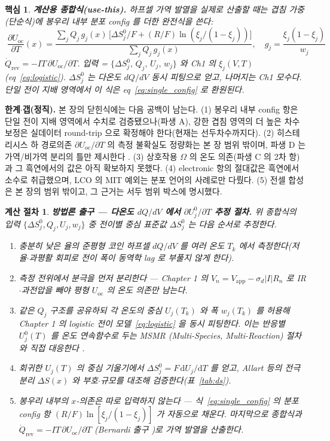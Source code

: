 \documentclass[11pt,a4paper]{article}
\newtheorem*{keybox}{핵심}
\newtheorem*{procedurebox}{계산 절차}
\newcommand{\dd}{\mathrm{d}}
\newcommand{\rev}{\mathrm{rev}}
\newcommand{\oc}{\mathrm{oc}}
\begin{document}
\begin{keybox}
\textbf{계산용 종합식(use-this).} 하프셀 가역 발열을 실제로 산출할 때는 겹침 가중(단순식)에 봉우리 내부 분포
config 를 더한 \emph{완전식}을 쓴다:
\[
\boxed{\;\frac{\partial U_\oc}{\partial T}(x)
=\frac{\sum_j Q_j\,g_j(x)\,\bigl[\Delta S^0_j/F+(R/F)\ln(\xi_j/(1-\xi_j))\bigr]}{\sum_j Q_j\,g_j(x)},\quad
g_j=\frac{\xi_j(1-\xi_j)}{w_j}\;}
\]
$\dot Q_\rev=-IT\,\partial U_\oc/\partial T$. \emph{입력} = $\{\Delta S^0_j,\,Q_j,\,U_j,\,w_j\}$ 와 Ch1 의
$\xi_j(V,T)$(eq~\eqref{eq:logistic}). $\Delta S^0_j$ 는 다온도 $dQ/dV$ 동시 피팅으로 얻고, 나머지는 Ch1 모수다.
단일 전이 지배 영역에서 이 식은 eq~\eqref{eq:single_config} 로 환원된다.
\end{keybox}

\textbf{한계$\cdot$갭(정직).} 본 장의 닫힌식에는 다음 공백이 남는다. (1) 봉우리 내부 config 항은 단일 전이
지배 영역에서 수치로 검증됐으나(파생 A), 강한 겹침 영역의 더 높은 차수 보정은 실데이터 round-trip 으로
확정해야 한다(현재는 선두차수까지다). (2) 히스테리시스 하 경로의존 $\partial U_\oc/\partial T$ 의 측정 불확실도
정량화는 본 장 범위 밖이며, 파생 D 는 가역/비가역 분리의 틀만 제시한다 \cite{hysteresis2018}. (3) 상호작용
$\Omega$ 의 온도 의존(파생 C 의 2차 항)과 그 흑연에서의 값은 아직 확보하지 못했다. (4) electronic 항의 절대값은
흑연에서 소수로 취급했으며, LCO 의 MIT 예외는 분포 언어의 사례로만 다뤘다. (5) 전셀 합성은 본 장의 범위
밖이고, 그 근거는 서두 범위 박스에 명시했다.

\begin{procedurebox}
\textbf{방법론 출구 — 다온도 $dQ/dV$ 에서 $\partial U_j^0/\partial T$ 추정 절차.} 위 종합식의 입력
$\{\Delta S^0_j,Q_j,U_j,w_j\}$ 중 전이별 중심 표준값 $\Delta S^0_j$ 는 다음 순서로 추정한다.
\begin{enumerate}[leftmargin=1.8em,itemsep=2pt,topsep=2pt]
\item 충분히 낮은 율의 준평형 코인 하프셀 $dQ/dV$ 를 여러 온도 $T_k$ 에서 측정한다(저율$\cdot$과평활 회피로
전이 폭이 동역학 lag 로 부풀지 않게 한다).
\item 측정 전위에서 분극을 먼저 분리한다 — Chapter 1 의 $V_n=V_\mathrm{app}-\sigma_d|I|R_n$ 로 IR$\cdot$과전압을
빼야 \emph{평형} $U_\oc$ 의 온도 의존만 남는다.
\item 같은 $Q_j$ 구조를 공유하되 각 온도의 중심 $U_j(T_k)$ 와 폭 $w_j(T_k)$ 를 허용해 Chapter 1 의 logistic
전이 모델~\eqref{eq:logistic} 을 \emph{동시} 피팅한다. 이는 반응별 $U_j^0(T)$ 를 온도 연속함수로 두는 MSMR
(Multi-Species, Multi-Reaction) 절차와 직접 대응한다 \cite{msmr_partI,msmr_partII}.
\item 회귀한 $U_j(T)$ 의 중심 기울기에서 $\Delta S^0_j=F\,\dd U_j/\dd T$ 를 얻고, Allart 등의 전극 분리
$\Delta S(x)$ \cite{allart2018} 와 부호$\cdot$규모를 대조해 검증한다(표~\ref{tab:ds}).
\item 봉우리 \emph{내부}의 $x$-의존은 따로 입력하지 않는다 — 식~\eqref{eq:single_config} 의 분포 config 항
$(R/F)\ln[\xi_j/(1-\xi_j)]$ 가 자동으로 채운다. 마지막으로 종합식과 $\dot Q_\rev=-IT\,\partial U_\oc/\partial T$
(Bernardi 출구 \cite{bernardi1985})로 가역 발열을 산출한다.
\end{enumerate}
\end{procedurebox}
\end{document}
